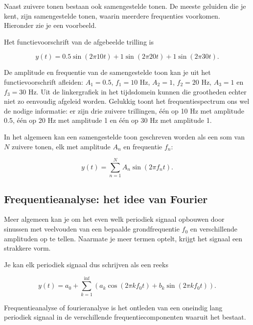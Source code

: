 Naast zuivere tonen bestaan ook samengestelde tonen. De meeste geluiden die je kent, zijn samengestelde tonen, waarin meerdere frequenties voorkomen. Hieronder zie je een voorbeeld.


Het functievoorschrift van de afgebeelde trilling is 

\begin{equation*}
y(t) = 0.5 \sin(2 \pi 10 t) + 1 \sin(2 \pi 20 t) + 1 \sin(2 \pi 30 t).
\end{equation*}

De amplitude en frequentie van de samengestelde toon kan je uit het functievoorschrift afleiden: $A_1 = 0.5$, $f_1 = 10$ Hz, $A_2 = 1$, $f_2 = 20$ Hz, $A_3 = 1$ en $f_3 = 30$ Hz. Uit de linkergrafiek in het tijdsdomein kunnen die grootheden echter niet zo eenvoudig afgeleid worden. Gelukkig toont het frequentiespectrum ons wel de nodige informatie: er zijn drie zuivere trillingen, \'e\'en op 10 Hz met amplitude 0.5, \'e\'en op 20 Hz met amplitude 1 en \'e\'en op 30 Hz met amplitude 1.

In het algemeen kan een samengestelde toon geschreven worden als een som van $N$ zuivere tonen, elk met amplitude $A_n$ en frequentie $f_n$:

\begin{equation*}
y(t) = \sum_{n=1}^{N} A_n \sin(2 \pi f_n t).
\end{equation*}

\subsection{Frequentieanalyse: het idee van Fourier}

Meer algemeen kan je om het even welk periodiek signaal opbouwen door sinussen met veelvouden van een bepaalde grondfrequentie $f_0$ en verschillende amplituden op te tellen. Naarmate je meer termen optelt, krijgt het signaal een strakkere vorm.

Je kan elk periodiek signaal dus schrijven als een reeks

\begin{equation*}
y(t) = a_0 + \sum_{k=1}^{\inf} (a_k \cos(2 \pi k f_0 t) + b_k \sin(2 \pi k f_0 t)).
\end{equation*}

Frequentieanalyse of fourieranalyse is het ontleden van een oneindig lang periodiek signaal in de verschillende frequentiecomponenten waaruit het bestaat. 

